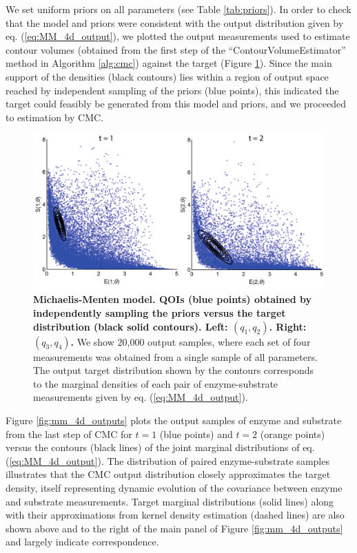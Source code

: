We set uniform priors on all parameters (see Table \ref{tab:priors}). In order to check that the model and priors were consistent with the output distribution given by eq. (\ref{eq:MM_4d_output}), we plotted the output measurements used to estimate contour volumes (obtained from the first step of the ``ContourVolumeEstimator'' method in Algorithm \ref{alg:cmc}) against the target (Figure \ref{fig:mm_4d_main}). Since the main support of the densities (black contours) lies within a region of output space reached by independent sampling of the priors (blue points), this indicated the target could feasibly be generated from this model and priors, and we proceeded to estimation by CMC.

\begin{figure}[H]
  \centerline{\includegraphics[width=\textwidth]{../figures/mm_4d_main.pdf}}
  \caption{\textbf{Michaelis-Menten model. QOIs (blue points) obtained by independently sampling the priors versus the target distribution (black solid contours). Left: $(q_1,q_2)$. Right: $(q_3,q_4)$.} We show 20,000 output samples, where each set of four measurements was obtained from a single sample of all parameters. The output target distribution shown by the contours corresponds to the marginal densities of each pair of enzyme-substrate measurements given by eq. (\ref{eq:MM_4d_output}).}
  \label{fig:mm_4d_main}
\end{figure}

Figure \ref{fig:mm_4d_outputs} plots the output samples of enzyme and substrate from the last step of CMC for $t=1$ (blue points) and $t=2$ (orange points) versus the contours (black lines) of the joint marginal distributions of eq. (\ref{eq:MM_4d_output}). The distribution of paired enzyme-substrate samples illustrates that the CMC output distribution closely approximates the target density, itself representing dynamic evolution of the covariance between enzyme and substrate measurements. Target marginal distributions (solid lines) along with their approximations from kernel density estimation (dashed lines) are also shown above and to the right of the main panel of Figure \ref{fig:mm_4d_outputs} and largely indicate correspondence.


